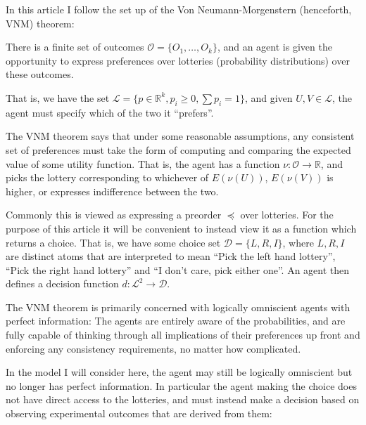 \documentclass[a4paper]{book}
\begin{document}
In this article I follow the set up of the Von Neumann-Morgenstern (henceforth,
VNM) theorem:

There is a finite set of outcomes $\mathcal{O} = \{O_1, \ldots, O_k\}$, and
an agent is given the opportunity to express preferences over lotteries (probability
distributions) over these outcomes.

That is, we have the set $\mathcal{L} = \{p \in \mathbb{R}^k, p_i \geq 0, \sum p_i = 1\}$,
and given \(U, V \in \mathcal{L}\), the agent must specify which of the two
it ``prefers''.

The VNM theorem says that under some reasonable assumptions,
any consistent set of preferences must take the form of computing and comparing
the expected value of some utility function. That is, the agent has a function
$\nu : \mathcal{O} \to \mathbb{R}$, and picks the lottery corresponding to whichever
of $E(\nu(U))$, $E(\nu(V))$ is higher, or expresses indifference between the two.

Commonly this is viewed as expressing a preorder $\preceq$ over lotteries. For
the purpose of this article it will be convenient to instead view it as a function
which returns a choice. That is, we have some choice set $\mathcal{D} = \{L, R, I\}$,
where $L, R, I$ are distinct atoms that are interpreted to mean ``Pick the left hand lottery'',
``Pick the right hand lottery'' and ``I don't care, pick either one''. An agent
then defines a decision function $d: \mathcal{L}^2 \to \mathcal{D}$.

The VNM theorem is primarily concerned with logically omniscient agents with
perfect information: The agents are entirely aware of the probabilities, and are
fully capable of thinking through all implications of their preferences up front
and enforcing any consistency requirements, no matter how complicated.

In the model I will consider here, the agent may still be logically omniscient
but no longer has perfect information. In particular the agent making the choice
does not have direct access to the lotteries, and must instead make a decision based on
observing experimental outcomes that are derived from them:
\end{document}
